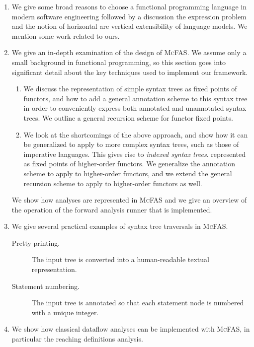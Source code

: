 \documentclass[letterpaper,11pt]{article}
\newcommand{\mcfas}{\textsc{McFAS}}
\begin{document}
\begin{enumerate}
    \item
        We give some broad reasons to choose a functional programming language
        in modern software engineering followed by a discussion the expression
        problem and the notion of horizontal are vertical extensibility of
        language models. We mention some work related to ours.

    \item
        We give an in-depth examination of the design of \mcfas{}. We assume
        only a small background in functional programming, so this section goes
        into significant detail about the key techniques used to implement our
        framework.

        \begin{enumerate}
            \item
                We discuss the representation of simple syntax trees as fixed
                points of functors, and how to add a general annotation scheme
                to this syntax tree in order to conveniently express both
                annotated and unannotated syntax trees. We outline a general
                recursion scheme for functor fixed points.

            \item
                We look at the shortcomings of the above approach, and show how
                it can be generalized to apply to more complex syntax trees,
                such as those of imperative languages. This gives rise to
                \emph{indexed syntax trees}.  represented as fixed points of
                higher-order functors. We generalize the annotation scheme to
                apply to higher-order functors, and we extend the general
                recursion scheme to apply to higher-order functors as well.
        \end{enumerate}

        We show how analyses are represented in \mcfas{} and we give an
        overview of the operation of the forward analysis runner that is
        implemented.

    \item
        We give several practical examples of syntax tree traversals in \mcfas.

        \begin{description}
            \item[Pretty-printing.]
                The input tree is converted into a human-readable textual
                representation.

            \item[Statement numbering.]
                The input tree is annotated so that each statement node is
                numbered with a unique integer.
        \end{description}

    \item
        We show how classical dataflow analyses can be implemented with \mcfas,
        in particular the reaching definitions analysis.
\end{enumerate}
\end{document}
